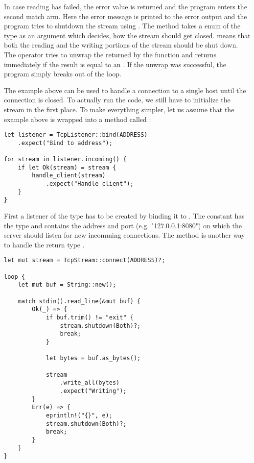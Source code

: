 In case reading has failed, the error value is returned and the program enters the second match arm. Here the error
message is printed to the error output and the program tries to shutdown the stream using
. The method takes a enum of the type  as an argument which
decides, how the stream should get closed.  means that both the reading and the writing portions of the
stream should be shut down. The  operator tries to unwrap the  returned by the function and
returns immediately if the result is equal to an . If the unwrap was successful, the program simply breaks
out of the loop.

The example above can be used to handle a connection to a single host until the connection is closed. To actually run
the code, we still have to initialize the stream in the first place. To make everything simpler, let us assume that
the example above is wrapped into a method called :

\begin{verbatim}
let listener = TcpListener::bind(ADDRESS)
    .expect("Bind to address");

for stream in listener.incoming() {
    if let Ok(stream) = stream {
        handle_client(stream)
            .expect("Handle client");
    }
}
\end{verbatim}

First a listener of the type  has to be created by binding it to . The
constant  has the type  and contains the address and port (e.g. "127.0.0.1:8080") on which the
server should listen for new incomming connections. The method  is another way to handle the return type
.

\begin{verbatim}
let mut stream = TcpStream::connect(ADDRESS)?;

loop {
    let mut buf = String::new();

    match stdin().read_line(&mut buf) {
        Ok(_) => {
            if buf.trim() != "exit" {
                stream.shutdown(Both)?;
                break;
            }

            let bytes = buf.as_bytes();

            stream
                .write_all(bytes)
                .expect("Writing");
        }
        Err(e) => {
            eprintln!("{}", e);
            stream.shutdown(Both)?;
            break;
        }
    }
}
\end{verbatim}
